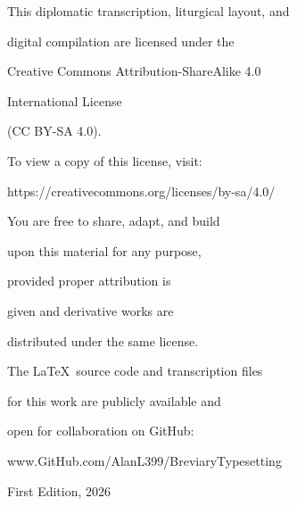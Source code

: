 \documentclass[openany]{book}
\renewcommand{\\}{\par\hspace*{.1em}} %
\newcommand{\ubchapter}[1]{%
	\chapter*{}%
	\addcontentsline{toc}{chapter}{#1}%
	\renewcommand{\leftmark}{#1}%
	\phantomsection%
	\hypertarget{#1}{}%
	\vspace{+\baselineskip}%
}
\newcommand{\ubsection}[2]{%
	\renewcommand{\rightmark}{#1}%
	\phantomsection%
	\addcontentsline{toc}{section}{#1}%
	\hypertarget{#2}{}%
}
\renewcommand{\newline}{\par \noindent}
\begin{document}
\begin{center}


This diplomatic transcription, liturgical layout, and 
\newline digital compilation are licensed under the
\newline Creative Commons Attribution-ShareAlike 4.0
\newline International License
\newline (CC BY-SA 4.0).
\end{center}
\begin{center}

\newline To view a copy of this license, visit:
\newline https://creativecommons.org/licenses/by-sa/4.0/
\end{center}
\begin{center}

You are free to share, adapt, and build
\newline upon this material for any purpose,
\newline provided proper attribution is
\newline given and derivative works are
\newline distributed under the same license.
\end{center}
\begin{center}

\newline The \LaTeX \ source code and transcription files
\newline for this work are publicly available and
\newline open for collaboration on GitHub:
\newline www.GitHub.com/AlanL399/BreviaryTypesetting
\end{center}
\begin{center}

First Edition, 2026
\end{center}


{}
\tableofcontents




\end{document}
